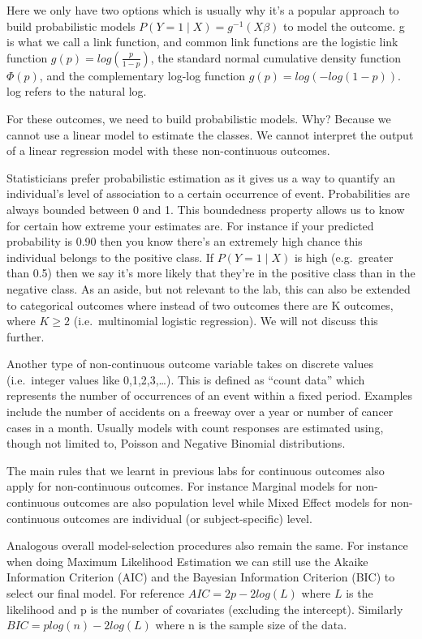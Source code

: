 \documentclass[
  letterpaper,
  DIV=11,
  numbers=noendperiod]{scrreprt}
\begin{document}
Here we only have two options which is usually why it's a popular
approach to build probabilistic models \(P(Y=1 \mid X)=g^{-1}(X\beta)\)
to model the outcome. g is what we call a link function, and common link
functions are the logistic link function \(g(p) = log(\frac{p}{1-p})\),
the standard normal cumulative density function \(\Phi(p)\), and the
complementary log-log function \(g(p) = log(-log(1-p))\). log refers to
the natural log.

For these outcomes, we need to build probabilistic models. Why? Because
we cannot use a linear model to estimate the classes. We cannot
interpret the output of a linear regression model with these
non-continuous outcomes.

Statisticians prefer probabilistic estimation as it gives us a way to
quantify an individual's level of association to a certain occurrence of
event. Probabilities are always bounded between 0 and 1. This
boundedness property allows us to know for certain how extreme your
estimates are. For instance if your predicted probability is 0.90 then
you know there's an extremely high chance this individual belongs to the
positive class. If \(P(Y=1 \mid X)\) is high (e.g.~greater than 0.5)
then we say it's more likely that they're in the positive class than in
the negative class. As an aside, but not relevant to the lab, this can
also be extended to categorical outcomes where instead of two outcomes
there are K outcomes, where \(K \ge 2\) (i.e.~multinomial logistic
regression). We will not discuss this further.

Another type of non-continuous outcome variable takes on discrete values
(i.e.~integer values like 0,1,2,3,\dots). This is defined as ``count
data'' which represents the number of occurrences of an event within a
fixed period. Examples include the number of accidents on a freeway over
a year or number of cancer cases in a month. Usually models with count
responses are estimated using, though not limited to, Poisson and
Negative Binomial distributions.

The main rules that we learnt in previous labs for continuous outcomes
also apply for non-continuous outcomes. For instance Marginal models for
non-continuous outcomes are also population level while Mixed Effect
models for non-continuous outcomes are individual (or subject-specific)
level.

Analogous overall model-selection procedures also remain the same. For
instance when doing Maximum Likelihood Estimation we can still use the
Akaike Information Criterion (AIC) and the Bayesian Information
Criterion (BIC) to select our final model. For reference
\(AIC = 2p - 2log(L)\) where \(L\) is the likelihood and p is the number
of covariates (excluding the intercept). Similarly
\(BIC = plog(n) - 2log(L)\) where n is the sample size of the data.
\end{document}
